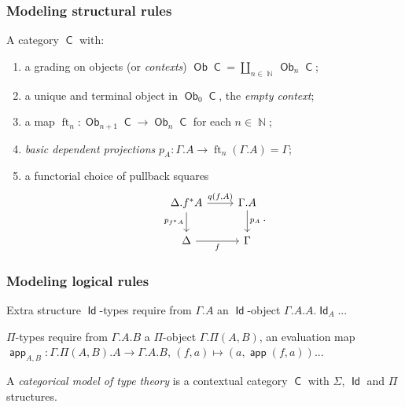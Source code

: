 \documentclass{beamer}
\DeclareMathOperator{\Id}{\mathsf{Id}}
\DeclareMathOperator{\sfC}{\mathsf{C}}
\DeclareMathOperator{\N}{\mathbb{N}}
\DeclareMathOperator{\Ob}{\mathsf{Ob}}
\DeclareMathOperator{\ft}{ft}
\DeclareMathOperator{\app}{\mathsf{app}}
\begin{document}
\begin{frame}
  \frametitle{Modeling structural rules}

  \begin{definition}
    A category $\sfC$ with:
    \begin{enumerate}
      \item a grading on objects (or \emph{contexts}) $\Ob\sfC=\coprod_{n\in\N}\Ob_n\sfC$;
      \item a unique and terminal object in $\Ob_0\sfC$, the \emph{empty context};
      \item a map $\ft_n\colon\Ob_{n+1}\sfC\rightarrow\Ob_n\sfC$ for each
        $n\in\N$;
      \item \emph{basic dependent projections}
        $p_A\colon\Gamma.A\rightarrow\ft_n(\Gamma.A)=\Gamma$;
      \item a functorial choice of pullback squares
        \[\begin{tikzcd}[ampersand replacement=\&]
          {\Delta.f^*A} \& {\Gamma.A} \\
          \Delta \& \Gamma
          \arrow["{p_A}", from=1-2, to=2-2]
          \arrow["{p_{f^*A}}"', from=1-1, to=2-1]
          \arrow["{q(f,A)}", from=1-1, to=1-2]
          \arrow["f"', from=2-1, to=2-2]
        \end{tikzcd}.\]
    \end{enumerate}
  \end{definition}
\end{frame}

\begin{frame}
  \frametitle{Modeling logical rules}

  \begin{block}{Extra structure}
    $\Id$-types require from $\Gamma.A$ an $\Id$-object $\Gamma.A.A.\Id_A$...
    
    $\Pi$-types require from $\Gamma.A.B$ a $\Pi$-object $\Gamma.\Pi(A,B)$, an
    evaluation map $\app_{A,B}\colon\Gamma.\Pi(A,B).A\rightarrow\Gamma.A.B$,
    $(f,a)\mapsto(a,\app(f,a))$...
  \end{block}
  \pause

  \begin{defn}
    A \emph{categorical model of type theory} is a contextual category $\sfC$
    with $\Sigma$, $\Id$ and $\Pi$ structures.
  \end{defn}
\end{frame}
\end{document}
